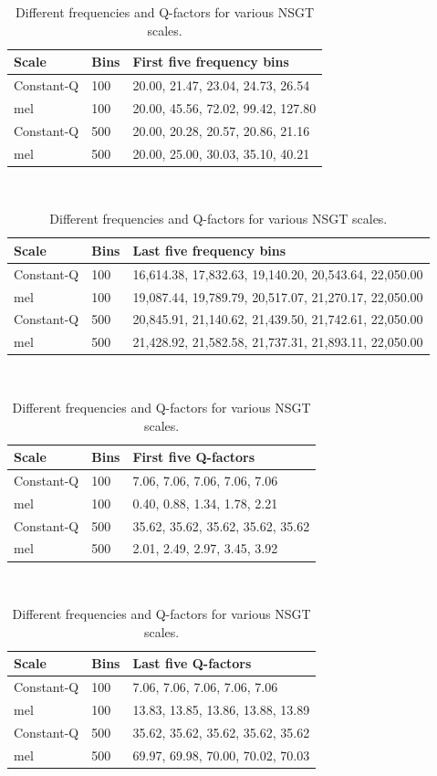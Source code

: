 \documentclass[report.tex]{subfiles}
\begin{document}
\begin{table}[ht]
	\centering
	\caption{Different frequencies and Q-factors for various NSGT scales.}
	\label{table:nsgtfreqsandqs}
\begin{tabular}{ |l|l|p{10cm}| }
	 \hline
	 Scale & Bins & First five frequency bins \\
	 \hline
	 \hline
	 Constant-Q & 100 & 20.00, 21.47, 23.04, 24.73, 26.54 \\
	 \hline
	 mel & 100 & 20.00, 45.56, 72.02, 99.42, 127.80 \\
	 \hline
	 Constant-Q & 500 & 20.00, 20.28, 20.57, 20.86, 21.16 \\
	 \hline
	 mel & 500 & 20.00, 25.00, 30.03, 35.10, 40.21 \\
	 \hline
\end{tabular}\\
\vspace{1em}
\begin{tabular}{ |l|l|p{10cm}| }
	 \hline
	 Scale & Bins & Last five frequency bins \\
	 \hline
	 \hline
	 Constant-Q & 100 & 16,614.38, 17,832.63, 19,140.20, 20,543.64, 22,050.00 \\
	 \hline
	 mel & 100 & 19,087.44, 19,789.79, 20,517.07, 21,270.17, 22,050.00 \\
	 \hline
	 Constant-Q & 500 & 20,845.91, 21,140.62, 21,439.50, 21,742.61, 22,050.00 \\
	 \hline
	 mel & 500 & 21,428.92, 21,582.58, 21,737.31, 21,893.11, 22,050.00 \\
	 \hline
\end{tabular}\\
\vspace{1em}
\begin{tabular}{ |l|l|p{10cm}| }
	 \hline
	 Scale & Bins & First five Q-factors \\
	 \hline
	 \hline
	 Constant-Q & 100 & 7.06, 7.06, 7.06, 7.06, 7.06 \\
	 \hline
	 mel & 100 & 0.40, 0.88, 1.34, 1.78, 2.21 \\
	 \hline
	 Constant-Q & 500 & 35.62, 35.62, 35.62, 35.62, 35.62 \\
	 \hline
	 mel & 500 & 2.01, 2.49, 2.97, 3.45, 3.92 \\
	 \hline
\end{tabular}\\
\vspace{1em}
\begin{tabular}{ |l|l|p{10cm}| }
	 \hline
	 Scale & Bins & Last five Q-factors \\
	 \hline
	 \hline
	 Constant-Q & 100 & 7.06, 7.06, 7.06, 7.06, 7.06 \\
	 \hline
	 mel & 100 & 13.83, 13.85, 13.86, 13.88, 13.89 \\
	 \hline
	 Constant-Q & 500 & 35.62, 35.62, 35.62, 35.62, 35.62 \\
	 \hline
	 mel & 500 & 69.97, 69.98, 70.00, 70.02, 70.03 \\
	 \hline
\end{tabular}
\end{table}
\end{document}

